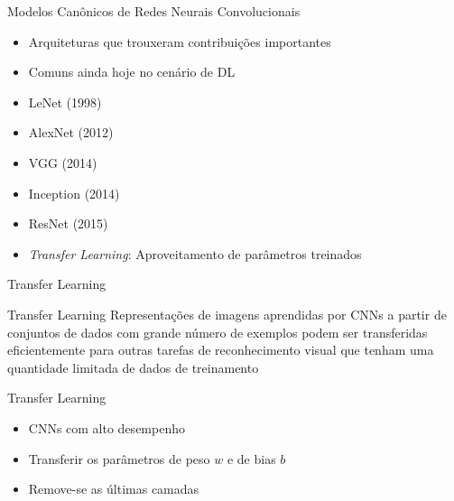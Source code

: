 \begin{frame}{\LARGE{Modelos Canônicos de Redes Neurais Convolucionais}}
   \ \  \\[0.1cm]
   \begin{itemize}
     \item Arquiteturas que trouxeram contribuições importantes
     \item Comuns ainda hoje no cenário de DL
     \ \ \newline
     \item LeNet (1998)
     \item AlexNet (2012)
     \item VGG (2014)
     \item Inception (2014)
     \item ResNet (2015)
     \ \ \newline
     \item \emph{Transfer Learning}: Aproveitamento de parâmetros treinados
   \end{itemize}
\end{frame}


\begin{frame}{Transfer Learning}
   \ \  \\[0.1cm]
     \begin{block}{Transfer Learning}
          Representações de imagens aprendidas por CNNs a partir de conjuntos de dados com grande número de exemplos podem ser transferidas eficientemente para outras tarefas de reconhecimento visual que tenham uma quantidade limitada de dados de treinamento
     \end{block}
\end{frame}

\begin{frame}{Transfer Learning}
   \ \  \\[0.1cm]
   \begin{itemize}
     \item CNNs com alto desempenho
     \item Transferir os parâmetros de peso $w$ e de bias $b$
     \item Remove-se as últimas camadas
   \end{itemize}
\end{frame}
